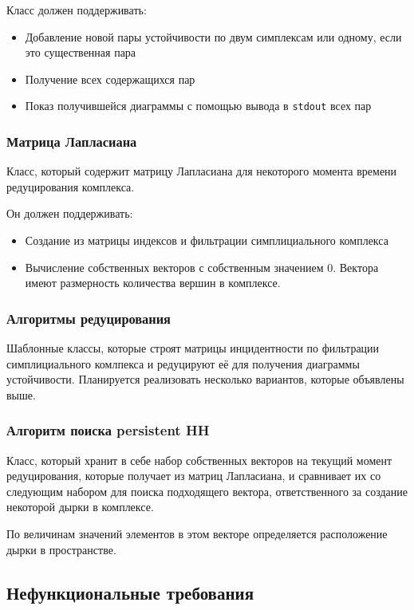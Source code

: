 \documentclass{article}
\begin{document}
Класс должен поддерживать:
\begin{itemize}
  \item Добавление новой пары устойчивости по двум симплексам или одному, если это существенная пара
  \item Получение всех содержащихся пар
  \item Показ получившейся диаграммы с помощью вывода в \verb"stdout" всех пар
\end{itemize}
\subsubsection{Матрица Лапласиана}
Класс, который содержит матрицу Лапласиана для некоторого момента времени редуцирования комплекса.

Он должен поддерживать:
\begin{itemize}
  \item Создание из матрицы индексов и фильтрации симплициального комплекса
  \item Вычисление собственных векторов с собственным значением 0. Вектора имеют размерность количества вершин в комплексе.
\end{itemize}
\subsubsection{Алгоритмы редуцирования}
Шаблонные классы, которые строят матрицы инцидентности по фильтрации симплициального комлпекса и редуцируют её для получения диаграммы устойчивости. Планируется реализовать несколько вариантов, которые объявлены выше.
\subsubsection{Алгоритм поиска persistent HH}
Класс, который хранит в себе набор собственных векторов на текущий момент редуцирования, которые получает из матриц Лапласиана, и сравнивает их со следующим набором для поиска подходящего вектора, ответственного за создание некоторой дырки в комплексе.

По величинам значений элементов в этом векторе определяется расположение дырки в пространстве.
\cite{laplacianmatrix}
\subsection{Нефункциональные требования}
\end{document}
